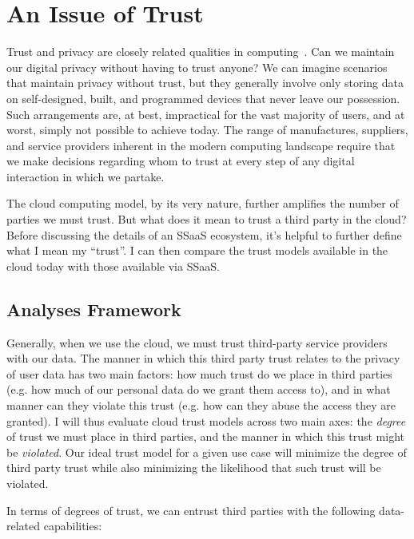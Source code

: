 \chapter{An Issue of Trust}
\label{chap:trust}

Trust and privacy are closely related qualities in
computing~\cite{flowerday2006}. Can we maintain our digital privacy
without having to trust anyone? We can imagine scenarios that maintain
privacy without trust, but they generally involve only storing data on
self-designed, built, and programmed devices that never leave our
possession. Such arrangements are, at best, impractical for the vast
majority of users, and at worst, simply not possible to achieve
today. The range of manufactures, suppliers, and service providers
inherent in the modern computing landscape require that we make
decisions regarding whom to trust at every step of any digital
interaction in which we partake.

The cloud computing model, by its very nature, further amplifies the
number of parties we must trust. But what does it mean to trust a
third party in the cloud? Before discussing the details of an SSaaS
ecosystem, it's helpful to further define what I mean my
``trust''. I can then compare the trust models available in the cloud
today with those available via SSaaS.

\section{Analyses Framework}
\label{chap:trust:framework}

Generally, when we use the cloud, we must trust third-party service
providers with our data. The manner in which this third party trust
relates to the privacy of user data has two main factors: how much
trust do we place in third parties (e.g. how much of our personal data
do we grant them access to), and in what manner can they violate this
trust (e.g. how can they abuse the access they are granted). I will thus
evaluate cloud trust models across two main axes: the \emph{degree} of
trust we must place in third parties, and the manner in which this
trust might be \emph{violated}. Our ideal trust model for a given use
case will minimize the degree of third party trust while also
minimizing the likelihood that such trust will be violated.

In terms of degrees of trust, we can entrust third parties with the
following data-related capabilities:


